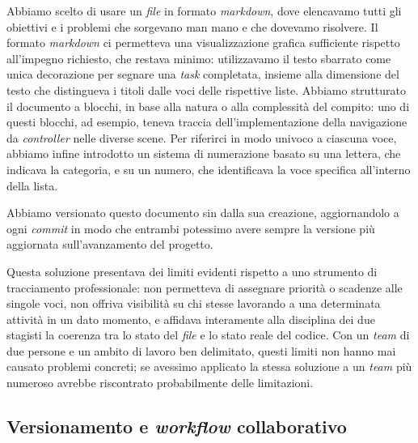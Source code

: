 Abbiamo scelto di usare un \textit{file} in formato \textit{markdown}, dove elencavamo tutti gli obiettivi e i problemi che sorgevano man mano e che dovevamo risolvere. Il formato \textit{markdown} ci permetteva una visualizzazione grafica sufficiente rispetto all'impegno richiesto, che restava minimo: utilizzavamo il testo sbarrato come unica decorazione per segnare una \textit{task} completata, insieme alla dimensione del testo che distingueva i titoli dalle voci delle rispettive liste. Abbiamo strutturato il documento a blocchi, in base alla natura o alla complessità del compito: uno di questi blocchi, ad esempio, teneva traccia dell'implementazione della navigazione da \textit{controller} nelle diverse scene. Per riferirci in modo univoco a ciascuna voce, abbiamo infine introdotto un sistema di numerazione basato su una lettera, che indicava la categoria, e su un numero, che identificava la voce specifica all'interno della lista.
 
Abbiamo versionato questo documento sin dalla sua creazione, aggiornandolo a ogni \textit{commit} in modo che entrambi potessimo avere sempre la versione più aggiornata sull'avanzamento del progetto.
 
Questa soluzione presentava dei limiti evidenti rispetto a uno strumento di tracciamento professionale: non permetteva di assegnare priorità o scadenze alle singole voci, non offriva visibilità su chi stesse lavorando a una determinata attività in un dato momento, e affidava interamente alla disciplina dei due stagisti la coerenza tra lo stato del \textit{file} e lo stato reale del codice. Con un \textit{team} di due persone e un ambito di lavoro ben delimitato, questi limiti non hanno mai causato problemi concreti; se avessimo applicato la stessa soluzione a un \textit{team} più numeroso avrebbe riscontrato probabilmente delle limitazioni.
 
\subsection{Versionamento e \textit{workflow} collaborativo}
\label{sec:versionamento}


